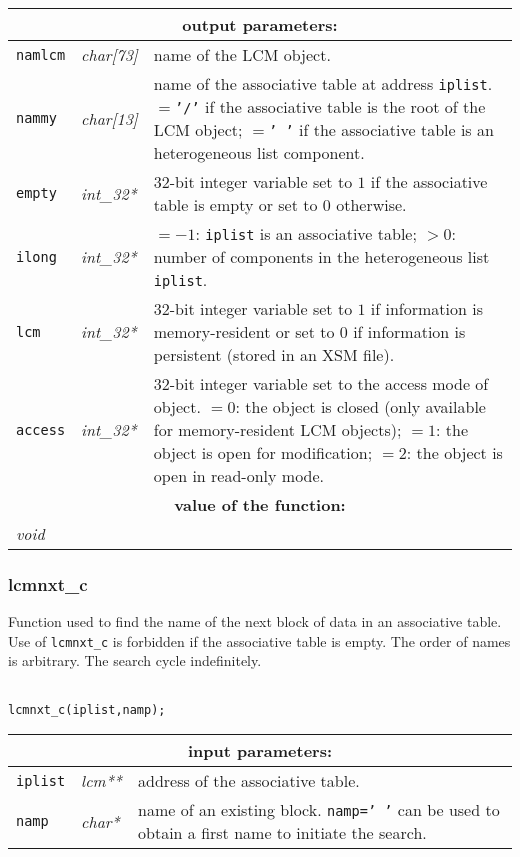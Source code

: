 \noindent
\begin{tabular}{|p{1.5cm}|p{2cm}|p{11cm}|}
\hline
\multicolumn{3}{|c|}{\bf output parameters:} \\
\hline
{\tt namlcm} & {\it char[73]} & name of the LCM object. \\
\hline
{\tt nammy} & {\it char[13]} & name of the associative table at address {\tt iplist}. $=${\tt '/'} if the associative table
is the root of the LCM object; $=${\tt ' '} if the associative table
is an heterogeneous list component. \\
\hline
{\tt empty} & {\it int\_32*} & 32-bit integer variable set to $1$ 
                            if the associative table is empty
			    or set to $0$ otherwise. \\
\hline
{\tt ilong} & {\it int\_32*} & $=-1$: {\tt iplist} is an associative table; $>0$: number of components in the heterogeneous list {\tt iplist}. \\
\hline
{\tt lcm} & {\it int\_32*} & 32-bit integer variable set to $1$ 
                                  if information is memory-resident or set to $0$ if information is persistent (stored in an XSM file). \\
\hline
{\tt access} & {\it int\_32*} & 32-bit integer variable set to the access mode of object. $=0$: the object
is closed (only available for memory-resident LCM objects); $=1$: the object is open for modification;
$=2$: the object is open in read-only mode.\\
\hline
\multicolumn{3}{|c|}{\bf value of the function:} \\
\hline
\multicolumn{2}{|l|}{\it void} &  \\
\hline
\end{tabular}

\subsubsection{lcmnxt\_c}

Function used to find the name of the next block of data in an associative table. Use
of {\tt lcmnxt\_c} is forbidden if the associative table is empty. The order of names is
arbitrary. The search cycle indefinitely.

\begin{verbatim}

lcmnxt_c(iplist,namp);
\end{verbatim}

\noindent
\begin{tabular}{|p{1.5cm}|p{2cm}|p{11cm}|}
\hline
\multicolumn{3}{|c|}{\bf input parameters:} \\
\hline
{\tt iplist} & {\it lcm**} & address of the associative table. \\
\hline
{\tt namp} & {\it char*} & name of an existing block. 
                                   {\tt namp=' '} can be used to obtain a first name to initiate the search. \\
\hline
\end{tabular}

